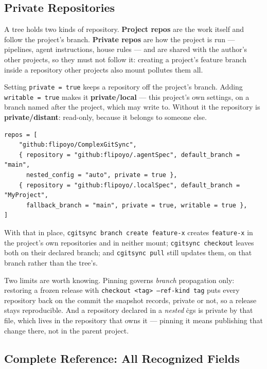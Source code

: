 \subsection{Private Repositories}
\label{subsec:cgs-private}

A tree holds two kinds of repository. \textbf{Project repos} are the work
itself and follow the project's branch. \textbf{Private repos} are how the
project is run --- pipelines, agent instructions, house rules --- and are
shared with the author's other projects, so they must not follow it:
creating a project's feature branch inside a repository other projects also
mount pollutes them all.

Setting \texttt{private = true} keeps a repository off the project's
branch. Adding \texttt{writable = true} makes it \textbf{private/local} ---
this project's own settings, on a branch named after the project, which
\cgscli{} may write to. Without it the repository is
\textbf{private/distant}: read-only, because it belongs to someone else.

\begin{lstlisting}
repos = [
    "github:flipoyo/ComplexGitSync",
    { repository = "github:flipoyo/.agentSpec", default_branch = "main",
      nested_config = "auto", private = true },
    { repository = "github:flipoyo/.localSpec", default_branch = "MyProject",
      fallback_branch = "main", private = true, writable = true },
]
\end{lstlisting}

With that in place, \texttt{cgitsync branch create feature-x} creates
\texttt{feature-x} in the project's own repositories and in neither mount;
\texttt{cgitsync checkout} leaves both on their declared branch; and
\texttt{cgitsync pull} still updates them, on that branch rather than the
tree's.

Two limits are worth knowing. Pinning governs \emph{branch} propagation
only: restoring a frozen release with \texttt{checkout <tag> --ref-kind tag} puts every
repository back on the commit the snapshot records, private or not, so a
release stays reproducible. And a repository declared in a \emph{nested}
\.cgs is private by that file, which lives in the repository that owns it ---
pinning it means publishing that change there, not in the parent project.

\subsection{Complete Reference: All Recognized Fields}
\label{subsec:cgs-fields}


